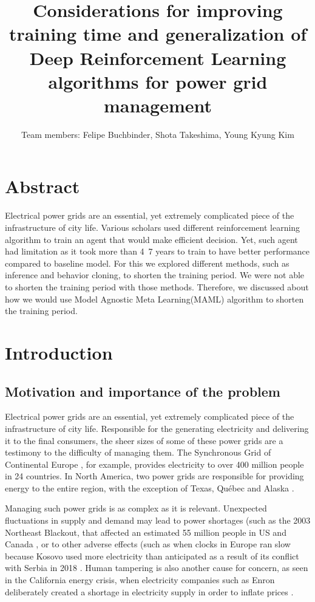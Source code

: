 \documentclass{article}
\title{Considerations for improving training time and generalization of Deep Reinforcement Learning algorithms for power grid management}
\author{
  Team members: Felipe Buchbinder, Shota Takeshima, Young Kyung Kim
}
\begin{document}
\maketitle

\section*{Abstract}

Electrical power grids are an essential, yet extremely complicated piece of the infrastructure of city life. Various scholars used different reinforcement learning algorithm to train an agent that would make efficient decision. Yet, such agent had limitation as it took more than 4~7 years to train to have better performance compared to baseline model. For this we explored different methods, such as inference and behavior cloning, to shorten the training period. We were not able to shorten the training period with those methods. Therefore, we discussed about how we would use Model Agnostic Meta Learning(MAML) algorithm to shorten the training period.

\section{Introduction}
\label{section:Introduction}

\subsection{Motivation and importance of the problem}
\label{section:motivation}

Electrical power grids are an essential, yet extremely complicated piece of the infrastructure of city life. Responsible for the generating electricity and delivering it to the final consumers, the sheer sizes of some of these power grids are a testimony to the difficulty of managing them. The Synchronous Grid of Continental Europe \cite{SGCE}, for example, provides electricity to over 400 million people in 24 countries. In North America, two power grids are responsible for providing energy to the entire region, with the exception of Texas, Québec and Alaska \cite{NATG}. 

Managing such power grids is as complex as it is relevant. Unexpected fluctuations in supply and demand may lead to power shortages (such as the 2003 Northeast Blackout, that affected an estimated 55 million people in US and Canada \cite{Northeast-Blackout}, or to other adverse effects (such as when clocks in Europe ran slow because Kosovo used more electricity than anticipated as a result of its conflict with Serbia in 2018 \cite{Kosovo}. Human tampering is also another cause for concern, as seen in the California energy crisis, when electricity companies such as Enron deliberately created a shortage in electricity supply in order to inflate prices \cite{California-Energy-Crisis}.
\end{document}

